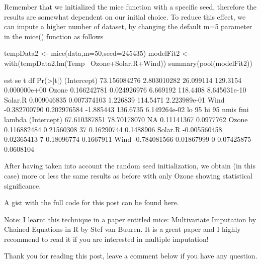 \begin{frame}
Remember that we initialized the mice function with a specific seed, therefore the results are somewhat dependent on our initial choice. To reduce this effect, we can impute a higher number of dataset, by changing the default m=5 parameter in the mice() function as follows

tempData2 <- mice(data,m=50,seed=245435)
modelFit2 <- with(tempData2,lm(Temp~ Ozone+Solar.R+Wind))
summary(pool(modelFit2))
\end{frame}
\begin{frame}
                     est          se         t       df     Pr(>|t|)
(Intercept) 73.156084276 2.803010282 26.099114 129.3154 0.000000e+00
Ozone        0.166242781 0.024926976  6.669192 118.4408 8.645631e-10
Solar.R      0.009046835 0.007374103  1.226839 114.5471 2.223989e-01
Wind        -0.382700790 0.202976584 -1.885443 136.6735 6.149264e-02
                   lo 95       hi 95 nmis        fmi    lambda
(Intercept) 67.610387851 78.70178070   NA 0.11141367 0.0977762
Ozone        0.116882484  0.21560308   37 0.16290744 0.1488906
Solar.R     -0.005560458  0.02365413    7 0.18096774 0.1667911
Wind        -0.784081566  0.01867999    0 0.07425875 0.0608104
\end{frame}
\begin{frame}
After having taken into account the random seed initialization, we obtain (in this case) more or less the same results as before with only Ozone showing statistical significance.

A gist with the full code for this post can be found here.

Note: I learnt this technique in a paper entitled mice: Multivariate Imputation by Chained Equations in R by Stef van Buuren. It is a great paper and I highly recommend to read it if you are interested in multiple imputation!

Thank you for reading this post, leave a comment below if you have any question.
\end{frame}
